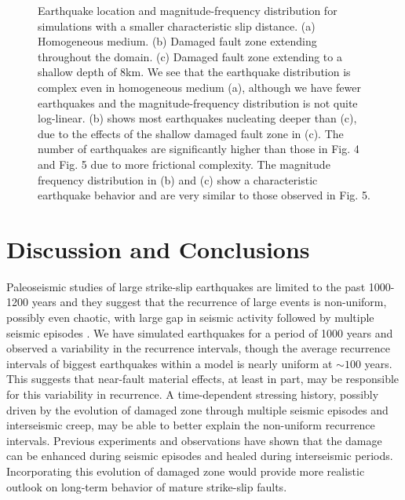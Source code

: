 \documentclass[11pt]{article}
\newcommand{\eric}[1]{{\color{blue}#1}}
\begin{document}
\begin{figure}[!htb]
{    }
    \caption{Earthquake location and magnitude-frequency distribution for simulations with a smaller characteristic slip distance. (a) Homogeneous medium. (b) Damaged fault zone extending throughout the domain. (c) Damaged fault zone extending to a shallow depth of 8km. We see that the earthquake distribution is complex even in homogeneous medium (a), although we have fewer earthquakes and the magnitude-frequency distribution is not quite log-linear. (b) shows most earthquakes nucleating deeper than (c), due to the effects of the shallow damaged fault zone in (c). The number of earthquakes are significantly higher than those in Fig. 4 and Fig. 5 due to more frictional complexity. The magnitude frequency distribution in (b) and (c) show a characteristic earthquake behavior and are very similar to those observed in Fig. 5.}
\end{figure}

\section{Discussion and Conclusions}
Paleoseismic studies of large strike-slip earthquakes are limited to the past 1000-1200 years and they suggest that the recurrence of large events is non-uniform, possibly even chaotic, with large gap in seismic activity followed by multiple seismic episodes \citep{goes_1996, seitz_2013, fumal_2002, toke_2006}. We have simulated earthquakes for a period of 1000 years and observed a variability in the recurrence intervals, \eric{though the average recurrence intervals of biggest earthquakes within a model is nearly uniform at $\sim 100$ years}. This suggests that near-fault material effects, at least in part, may be responsible for this variability in recurrence. A time-dependent stressing history, possibly driven by the evolution of damaged zone through multiple seismic episodes and interseismic creep, may be able to better explain the non-uniform  recurrence intervals.  Previous experiments and observations \citep{peng_2006, stanchits_2006} have shown that the damage can be enhanced during seismic episodes and healed during interseismic periods. Incorporating this evolution of damaged zone would provide more realistic outlook on long-term behavior of mature strike-slip faults.
\end{document}
